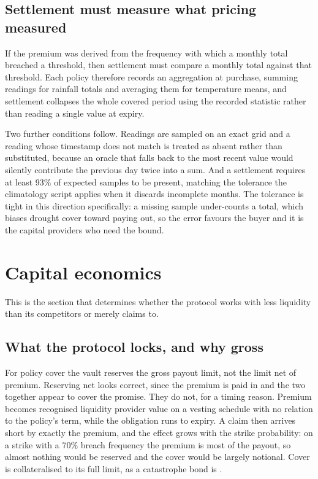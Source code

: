 \documentclass[11pt,a4paper]{article}
\begin{document}
\subsection{Settlement must measure what pricing measured}

If the premium was derived from the frequency with which a monthly total breached a
threshold, then settlement must compare a monthly total against that threshold. Each policy
therefore records an aggregation at purchase, summing readings for rainfall totals and
averaging them for temperature means, and settlement collapses the whole covered period using
the recorded statistic rather than reading a single value at expiry.

Two further conditions follow. Readings are sampled on an exact grid and a reading whose
timestamp does not match is treated as absent rather than substituted, because an oracle that
falls back to the most recent value would silently contribute the previous day twice into a
sum. And a settlement requires at least 93\% of expected samples to be present, matching the
tolerance the climatology script applies when it discards incomplete months. The tolerance is
tight in this direction specifically: a missing sample under-counts a total, which biases
drought cover toward paying out, so the error favours the buyer and it is the capital
providers who need the bound.

\section{Capital economics}
\label{sec:capital}

This is the section that determines whether the protocol works with less liquidity than its
competitors or merely claims to.

\subsection{What the protocol locks, and why gross}

For policy cover the vault reserves the gross payout limit, not the limit net of premium.
Reserving net looks correct, since the premium is paid in and the two together appear to
cover the promise. They do not, for a timing reason. Premium becomes recognised liquidity
provider value on a vesting schedule with no relation to the policy's term, while the
obligation runs to expiry. A claim then arrives short by exactly the premium, and the effect
grows with the strike probability: on a strike with a 70\% breach frequency the premium is
most of the payout, so almost nothing would be reserved and the cover would be largely
notional. Cover is collateralised to its full limit, as a catastrophe bond is
\cite{froot2001}.
\end{document}
